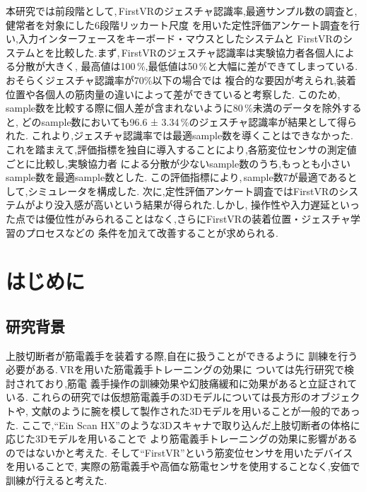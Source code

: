 \documentclass{ltjsreport}
\begin{document}
本研究では前段階として,\,FirstVRのジェスチャ認識率,最適サンプル数の調査と,健常者を対象にした6段階リッカート尺度
を用いた定性評価アンケート調査を行い,入力インターフェースをキーボード・マウスとしたシステムと
FirstVRのシステムとを比較した.まず,\,FirstVRのジェスチャ認識率は実験協力者各個人による分散が大きく,
最高値は100\,\%,最低値は50\,\%と大幅に差ができてしまっている.おそらくジェスチャ認識率が70\%以下の場合では
複合的な要因が考えられ,装着位置や各個人の筋肉量の違いによって差ができていると考察した.
このため,\,sample数を比較する際に個人差が含まれないように80\,\%未満のデータを除外すると,
どのsample数においても96.6 ± 3.34\,\%のジェスチャ認識率が結果として得られた.
これより,ジェスチャ認識率では最適sample数を導くことはできなかった.
これを踏まえて,評価指標を独自に導入することにより,各筋変位センサの測定値ごとに比較し,実験協力者
による分散が少ないsample数のうち,もっとも小さいsample数を最適sample数とした.
この評価指標により,\,sample数7が最適であるとして,シミュレータを構成した.
次に,定性評価アンケート調査ではFirstVRのシステムがより没入感が高いという結果が得られた.しかし,
操作性や入力遅延といった点では優位性がみられることはなく,さらにFirstVRの装着位置・ジェスチャ学習のプロセスなどの
条件を加えて改善することが求められる.
\clearpage

\setcounter{tocdepth}{2}
\tableofcontents

\clearpage


\chapter{はじめに}
	\section{研究背景}
		上肢切断者が筋電義手を装着する際,自在に扱うことができるように
		訓練を行う必要がある.\,VRを用いた筋電義手トレーニングの効果に
		ついては先行研究\cite{ref:1}\cite{ref:2}で検討されており,筋電
		義手操作の訓練効果や幻肢痛緩和に効果があると立証されている.
		これらの研究では仮想筋電義手の3Dモデルについては長方形のオブジェクトや,
		文献\cite{ref:1}のように腕を模して製作された3Dモデルを用いることが一般的であった.
		ここで,``Ein Scan HX''\cite{ref:3}のような3Dスキャナで取り込んだ上肢切断者の体格に応じた3Dモデルを用いることで
		より筋電義手トレーニングの効果に影響があるのではないかと考えた.
		そして``FirstVR''\cite{ref:4}という筋変位センサを用いたデバイスを用いることで,
		実際の筋電義手や高価な筋電センサを使用することなく,安価で訓練が行えると考えた.
\end{document}
